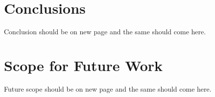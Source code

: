 \section{Conclusions}
Conclusion should be on new page and the same should come here.


\section{Scope for Future Work}
Future scope should be on new page and the same should come here.



	
	






